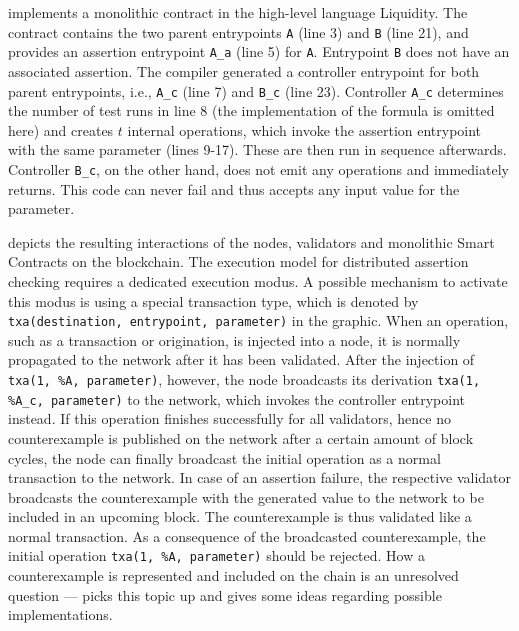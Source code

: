 implements a monolithic contract in the high-level language Liquidity. The contract contains the two parent entrypoints \texttt{A} (line 3) and \texttt{B} (line 21), and provides an assertion entrypoint \texttt{A\_a} (line 5) for \texttt{A}. Entrypoint \texttt{B} does not have an associated assertion. The compiler generated a controller entrypoint for both parent entrypoints, i.e., \texttt{A\_c} (line 7) and \texttt{B\_c} (line 23). Controller \texttt{A\_c} determines the number of test runs in line 8 (the implementation of the formula is omitted here) and creates $t$ internal operations, which invoke the assertion entrypoint with the same parameter (lines 9-17). These are then run in sequence afterwards. Controller \texttt{B\_c}, on the other hand, does not emit any operations and immediately returns. This code can never fail and thus accepts any input value for the parameter.


 depicts the resulting interactions of the nodes, validators and monolithic Smart Contracts on the blockchain. The execution model for distributed assertion checking requires a dedicated execution modus. A possible mechanism to activate this modus is using a special transaction type, which is denoted by \texttt{txa(destination, entrypoint, parameter)} in the graphic. When an operation, such as a transaction or origination, is injected into a node, it is normally propagated to the network after it has been validated. After the injection of \texttt{txa(1, \%A, parameter)}, however, the node broadcasts its derivation \texttt{txa(1, \%A\_c, parameter)} to the network, which invokes the controller entrypoint instead. If this operation finishes successfully for all validators, hence no counterexample is published on the network after a certain amount of block cycles, the node can finally broadcast the initial operation as a normal transaction to the network. In case of an assertion failure, the respective validator broadcasts the counterexample with the generated value to the network to be included in an upcoming block. The counterexample is thus validated like a normal transaction. As a consequence of the broadcasted counterexample, the initial operation \texttt{txa(1, \%A, parameter)} should be rejected. How a counterexample is represented and included on the chain is an unresolved question ---  picks this topic up and gives some ideas regarding possible implementations. 

